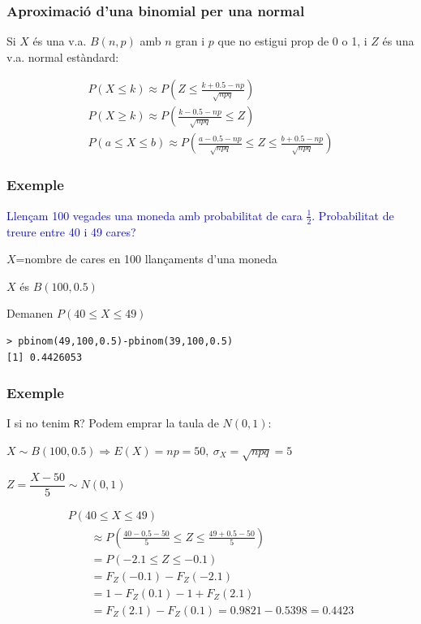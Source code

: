 \documentclass[12pt,t]{beamer}\usepackage[]{graphicx}\usepackage[]{color}
\newcommand{\blue}[1]{\textcolor{blue}{#1}}
\renewcommand{\leq}{\leqslant}
\renewcommand{\geq}{\geqslant}
\theoremstyle{plain}
\theoremstyle{definition}
\begin{document}
\begin{frame}
\frametitle{Aproximació d'una binomial per una normal}

Si $X$ és una v.a. $B(n,p)$ amb $n$ gran i $p$ que no estigui prop de 0 o 1, i $Z$ és una v.a. normal estàndard:



$$
\begin{array}{l}
P(X\leq k)  \displaystyle\approx P\left(Z \leq
\frac{{k+0.5-np}}{\sqrt{npq}}\right)\\[3ex]
P(X\geq k)  \displaystyle\approx P\left(
\frac{{k-0.5-np}}{\sqrt{npq}}\leq Z\right)\\[3ex]
P(a\leq X\leq b) \displaystyle\approx
P\left(\frac{a-0.5-np}{\sqrt{npq}}\leq Z \leq
\frac{b+0.5-np}{\sqrt{npq}}\right)
\end{array}
$$
\end{frame}




\begin{frame}[fragile]
\frametitle{Exemple}
\blue{Llençam 100 vegades una moneda amb probabilitat de cara $\frac{1}{2}$.
Probabilitat de treure entre 40 i 49 cares?}
\bigskip

 $X$=nombre de cares en 100 llançaments d'una moneda
 \medskip
 
$X$  és $B(100,0.5)$
 \medskip
 
 
 
 Demanen $P(40\leq X\leq 49)$
 \medskip

\begin{verbatim}
> pbinom(49,100,0.5)-pbinom(39,100,0.5)
[1] 0.4426053
\end{verbatim}
\end{frame}


\begin{frame}
\frametitle{Exemple}
\vspace*{-1ex}

I si no tenim {\tt R}? Podem emprar la taula de $N(0,1)$:\medskip

$X\sim B(100,0.5)\Rightarrow E(X)=np=50,\ \sigma_{X}=\sqrt{npq}=5$
\medskip

$Z=\dfrac{X-50}{5}\sim N(0,1)$

$$
\begin{array}{l}
P(40\leq X\leq 49) \\ \displaystyle \qquad \approx  P\left(\frac{40-0.5-50}{5}\leq Z\leq
    \frac{49+0.5-50}{5}\right) \\[2ex] \displaystyle 
\qquad =  P(-2.1\leq Z\leq -0.1)\\[1ex]\displaystyle 
\qquad =
    F_{Z}(-0.1)-  F_{Z}(-2.1) \\[1ex] \displaystyle 
\qquad =    1-F_{Z}(0.1)-1+F_{Z}(2.1)\\[1ex] \displaystyle 
\qquad =
F_{Z}(2.1)-F_{Z}(0.1) = 0.9821-0.5398=0.4423
\end{array}
$$
\end{frame}
\end{document}
